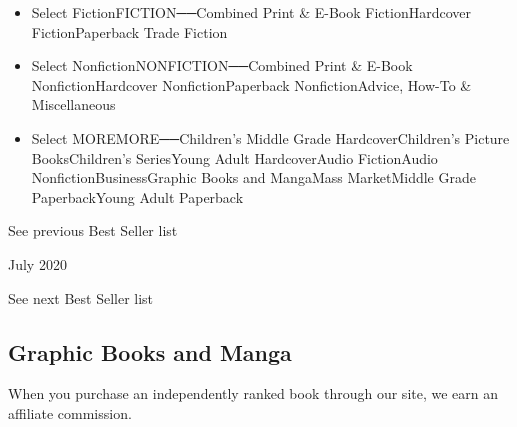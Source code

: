 \begin{itemize}
\tightlist
\item
  Select FictionFICTION──Combined Print \& E-Book FictionHardcover
  FictionPaperback Trade Fiction
\item
  Select NonfictionNONFICTION──Combined Print \& E-Book
  NonfictionHardcover NonfictionPaperback NonfictionAdvice, How-To \&
  Miscellaneous
\item
  Select MOREMORE──Children's Middle Grade HardcoverChildren's Picture
  BooksChildren's SeriesYoung Adult HardcoverAudio FictionAudio
  NonfictionBusinessGraphic Books and MangaMass MarketMiddle Grade
  PaperbackYoung Adult Paperback
\end{itemize}

\href{/books/best-sellers/2020/06/01/graphic-books-and-manga/}{}

See previous Best Seller list

July 2020

See next Best Seller list

\hypertarget{graphic-books-and-manga}{%
\subsection{Graphic Books and Manga}\label{graphic-books-and-manga}}

When you purchase an independently ranked book through our site, we earn
an affiliate commission.

